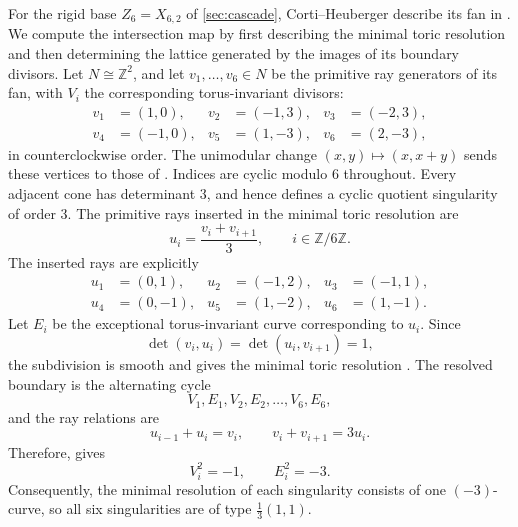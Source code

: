 \documentclass[11pt]{article}
\theoremstyle{plain}
\theoremstyle{definition}
\theoremstyle{remark}
\newcommand{\Z}{\mathbb Z}
\begin{document}
For the rigid base \(Z_6=X_{6,2}\) of \cref{sec:cascade},
Corti--Heuberger describe its fan in
\cite[Section~2.2.5]{Corti2016}. We compute the intersection map by first
describing the minimal toric resolution and then determining the lattice
generated by the images of its boundary divisors. Let \(N\cong\Z^2\), and let
\(v_1,\dots,v_6\in N\) be the primitive ray generators of its fan, with
\(V_i\) the corresponding torus-invariant divisors:
\[
\begin{aligned}
v_1&=(1,0),&
v_2&=(-1,3),&
v_3&=(-2,3),\\
v_4&=(-1,0),&
v_5&=(1,-3),&
v_6&=(2,-3),
\end{aligned}
\]
in counterclockwise order. The unimodular change
\((x,y)\mapsto(x,x+y)\) sends these vertices to those of
\cite[Figure~1]{Corti2016}. Indices are cyclic modulo \(6\) throughout. Every
adjacent cone has determinant \(3\), and hence defines a cyclic quotient
singularity of order \(3\). The primitive rays inserted in the
minimal toric resolution are
\[
u_i=\frac{v_i+v_{i+1}}3,
\qquad
i\in\Z/6\Z.
\]
The inserted rays are explicitly
\[
\begin{aligned}
u_1&=(0,1),&
u_2&=(-1,2),&
u_3&=(-1,1),\\
u_4&=(0,-1),&
u_5&=(1,-2),&
u_6&=(1,-1).
\end{aligned}
\]
Let \(E_i\) be the exceptional torus-invariant curve corresponding to
\(u_i\). Since
\[
\det(v_i,u_i)=\det(u_i,v_{i+1})=1,
\]
the subdivision is smooth and gives the minimal toric resolution
\cite[Chapters~10--11]{CoxLittleSchenck2011}. The resolved boundary is the
alternating cycle
\[
V_1,E_1,V_2,E_2,\dots,V_6,E_6,
\]
and the ray relations are
\[
u_{i-1}+u_i=v_i,
\qquad
v_i+v_{i+1}=3u_i.
\]
Therefore, \cite[Theorem~10.4.4]{CoxLittleSchenck2011} gives
\[
V_i^2=-1,\qquad E_i^2=-3.
\]
Consequently, the minimal resolution of each singularity consists of one
\((-3)\)-curve, so all six singularities are of type \(\frac13(1,1)\).
\end{document}
